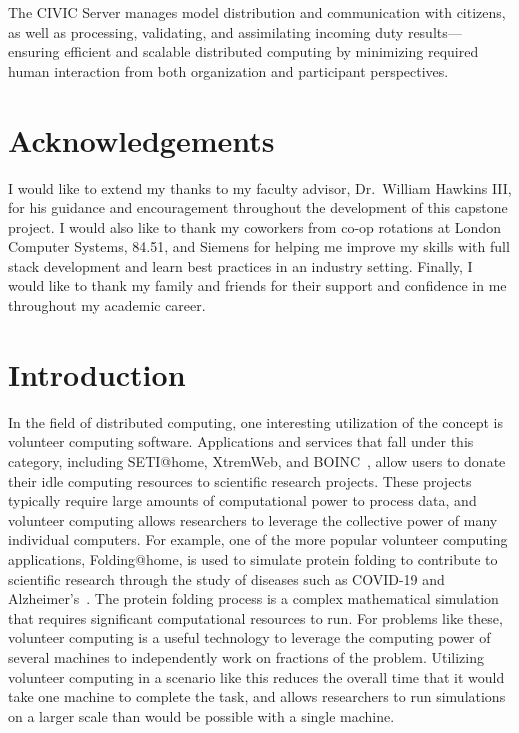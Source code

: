 \documentclass[11pt]{article}
\begin{document}
The CIVIC Server manages model distribution and communication with citizens, as well as processing, validating, and assimilating incoming duty results---ensuring efficient and scalable distributed computing by minimizing required human interaction from both organization and participant perspectives.

\vspace{-3mm}
\section*{\large Acknowledgements}
\vspace{-2.5mm}

I would like to extend my thanks to my faculty advisor, Dr.\ William Hawkins III, for his guidance and encouragement throughout the development of this capstone project. I would also like to thank my coworkers from co-op rotations at London Computer Systems, 84.51\degree, and Siemens for helping me improve my skills with full stack development and learn best practices in an industry setting. Finally, I would like to thank my family and friends for their support and confidence in me throughout my academic career.

\vspace{2.5mm}


\section{Introduction}

In the field of distributed computing, one interesting utilization of the concept is volunteer computing software. Applications and services that fall under this category, including SETI@home, XtremWeb, and BOINC~\cite{Mengistu2020}, allow users to donate their idle computing resources to scientific research projects. These projects typically require large amounts of computational power to process data, and volunteer computing allows researchers to leverage the collective power of many individual computers. For example, one of the more popular volunteer computing applications, Folding@home, is used to simulate protein folding to contribute to scientific research through the study of diseases such as COVID-19 and Alzheimer's~\cite{Voelz2023}. The protein folding process is a complex mathematical simulation that requires significant computational resources to run. For problems like these, volunteer computing is a useful technology to leverage the computing power of several machines to independently work on fractions of the problem. Utilizing volunteer computing in a scenario like this reduces the overall time that it would take one machine to complete the task, and allows researchers to run simulations on a larger scale than would be possible with a single machine.
\end{document}
